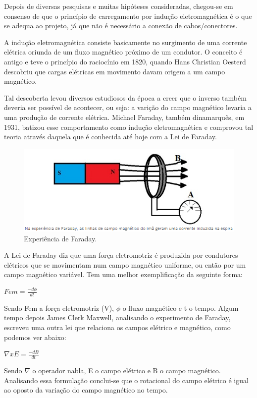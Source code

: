 Depois de diversas pesquisas e muitas hipóteses consideradas, chegou-se em consenso de que o princípio de carregamento por indução eletromagnética é o que se adequa ao projeto, já que não é necessário a conexão de cabos/conectores.

A indução eletromagnética consiste basicamente no surgimento de uma corrente elétrica oriunda de um fluxo magnético próximo de um condutor. O conceito é antigo e teve o princípio do raciocínio em 1820, quando Hans Christian Oesterd descobriu que cargas elétricas em movimento davam origem a um campo magnético.

 Tal descoberta levou diversos estudiosos da época a creer que o inverso também deveria ser possível de acontecer, ou seja: a varição do campo magnético levaria a uma produção de corrente elétrica. Michael Faraday, também dinamarquês, em 1931, batizou esse comportamento como indução eletromagnética e comprovou tal teoria através daquela que é conhecida até hoje com a Lei de Faraday.

 \begin{figure}[H]
	\centering
	\includegraphics[scale=0.7]{figuras/carregador_inducao}
	\caption{Experiência de Faraday.}
	\label{img:faraday}
\end{figure}

A Lei de Faraday diz que uma força eletromotriz é produzida por condutores elétricos que se movimentam num campo magnético uniforme, ou então por um campo magnético variável. Tem uma melhor exemplificação da seguinte forma:


	$Fem = \frac{-d \phi }{dt}$


Sendo Fem a força eletromotriz (V), $\phi$ o fluxo magnético e t o tempo. Algum tempo depois James Clerk Maxwell, analisando o experimento de Faraday, escreveu uma outra lei que relaciona os campos elétrico e magnético, como podemos ver abaixo:


	$\nabla xE = \frac{-dB}{dt}$


Sendo $\nabla$ o operador nabla, E o campo elétrico e B o campo magnético. Analisando essa formulação conclui-se que o rotacional do campo elétrico é igual ao oposto da variação do campo magnético no tempo.


